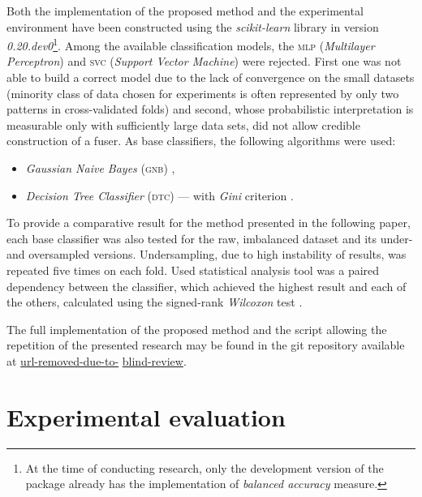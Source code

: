 \documentclass[pmlr]{jmlr}
\begin{document}
Both the implementation of the proposed method and the experimental environment have been constructed using the \emph{scikit-learn} library \citep{scikit-learn} in version \emph{0.20.dev0}\footnote{At the time of conducting research, only the development version of the package already has the implementation of \emph{balanced accuracy} measure.}. Among the available classification models, the \textsc{mlp} (\emph{Multilayer Perceptron}) and \textsc{svc} (\emph{Support Vector Machine}) were rejected. First one was not able to build a correct model due to the lack of convergence on the small datasets (minority class of data chosen for experiments is often represented by only two patterns in cross-validated folds) and second, whose probabilistic interpretation is measurable only with sufficiently large data sets, did not allow credible construction of a fuser. As base classifiers, the following algorithms were used:

\begin{itemize}
	\item \emph{Gaussian Naive Bayes} (\textsc{gnb}) \citep{gnb},
	\item \emph{Decision Tree Classifier} (\textsc{dtc}) --- with \emph{Gini} criterion \citep{loh2011classification}.
\end{itemize}

To provide a comparative result for the method presented in the following paper, each base classifier was also tested for the raw, imbalanced dataset and its under- and oversampled versions. Undersampling, due to high instability of results, was repeated five times on each fold. Used statistical analysis tool was a paired dependency between the classifier, which achieved the highest result and each of the others, calculated using the signed-rank \emph{Wilcoxon} test \citep{wilcoxon1945individual}.

The full implementation of the proposed method and the script allowing the repetition of the presented research may be found in the git repository available at \url{url-removed-due-to-} \url{blind-review}.

\section{Experimental evaluation}
\label{sec:intro}
\end{document}
